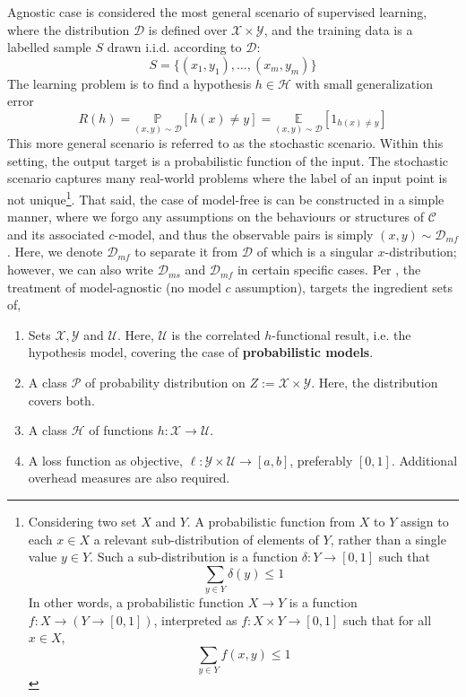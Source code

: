 Agnostic case is considered the most general scenario of supervised learning, where the distribution $\mathcal{D}$ is defined over $\mathcal{X}\times \mathcal{Y}$, and the training data is a labelled sample $S$ drawn i.i.d. according to $\mathcal{D}$: 
$$S=\{ (x_{1},y_{1}),\dots,(x_{m},y_{m}) \}$$
The learning problem is to find a hypothesis $h\in \mathcal{H}$ with small generalization error
\begin{equation}
    R(h)=\underset{(x,y)\sim \mathcal{D}}{\mathbb{P}}[h(x)\neq y]=\underset{(x,y)\sim \mathcal{D}}{\mathbb{E}}[1_{h(x)\neq y}]
\end{equation}
This more general scenario is referred to as the stochastic scenario. Within this setting, the output target is a probabilistic function of the input. The stochastic scenario captures many real-world problems where the label of an input point is not unique\footnote{
    Considering two set $X$ and $Y$. A probabilistic function from $X$ to $Y$ assign to each $x\in X$ a relevant sub-distribution of elements of $Y$, rather than a single value $y\in Y$. Such a sub-distribution is a function $\delta: Y \to [0,1]$ such that $$\sum_{y\in Y}\delta(y)\leq 1$$In other words, a probabilistic function $X\to Y$ is a function $f: X\to (Y\to[0,1])$, interpreted as $f: X \times Y\to[0,1]$ such that for all $x\in X$, $$\sum_{y\in Y}f(x,y)\leq 1$$
}.
That said, the case of model-free is can be constructed in a simple manner, where we forgo any assumptions on the behaviours or structures of $\mathcal{C}$ and its associated $c$-model, and thus the observable pairs is simply $(x,y)\sim\mathcal{D}_{mf}$. Here, we denote $\mathcal{D}_{mf}$ to separate it from $\mathcal{D}$ of which is a singular $x$-distribution; however, we can also write $\mathcal{D}_{ms}$ and $\mathcal{D}_{mf}$ in certain specific cases. Per \cite{STL_Hajek_Maxim_2021}, the treatment of model-agnostic (no model $c$ assumption), targets the ingredient sets of, 
\begin{enumerate}[itemsep=1pt,topsep=1pt]
    \item Sets $\mathcal{X}, \mathcal{Y}$ and $\mathcal{U}$. Here, $\mathcal{U}$ is the correlated $h$-functional result, i.e. the hypothesis model, covering the case of \textbf{probabilistic models}. 
    \item A class $\mathcal{P}$ of probability distribution on $Z:=\mathcal{X}\times \mathcal{Y}$. Here, the distribution covers both. 
    \item A class $\mathcal{H}$ of functions $h:\mathcal{X}\to\mathcal{U}$. 
    \item A loss function as objective, $\ell: \mathcal{Y}\times \mathcal{U}\to[a,b]$, preferably $[0,1]$. Additional overhead measures are also required. 
\end{enumerate}

